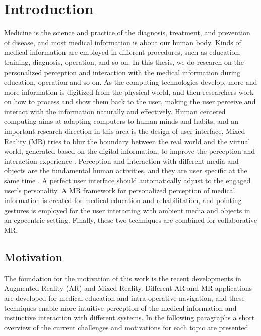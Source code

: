 %
\chapter{Introduction}  %
\label{sec:introduction}
Medicine is the science and practice of the diagnosis, treatment, and prevention of disease, and most medical information is about our human body. Kinds of medical information are employed in different procedures, such as education, training, diagnosis, operation, and so on. In this thesis, we do research on the personalized perception and interaction with the medical information during education, operation and so on. 
As the computing technologies develop, more and more information is digitized from the physical world, and then researchers work on how to process and show them back to the user, making the user perceive and interact with the information naturally and effectively. 
Human centered computing aims at adapting computers to human minds and habits, and an important research direction in this area is the design of user interface. 
Mixed Reality (MR) tries to blur the boundary between the real world and the virtual world, generated based on the digital information, to improve the perception and interaction experience \CN.
Perception and interaction with different media and objects are the fundamental human activities, and they are user specific at the same time \CN. A perfect user interface should automatically adjust to the engaged user's personality. 
A MR framework for personalized perception of medical information is created for medical education and rehabilitation, and pointing gestures is employed for the user interacting with ambient media and objects in an egocentric setting. Finally, these two techniques are combined for collaborative MR.

\section{Motivation}
The foundation for the motivation of this work is the recent developments in Augmented Reality (AR) and Mixed Reality. Different AR and MR applications are developed for medical education and intra-operative navigation, and these techniques enable more intuitive perception of the medical information and instinctive interaction with different systems. 
In the following paragraphs a short overview of the current challenges and motivations for each topic are presented. 

